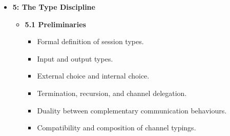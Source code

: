\begin{itemize}
\begin{itemize}
        \item \textbf{4.2 Unbounded Interactions}
        \begin{itemize}
            \item Representation of repeated interactions within one session.
            \item Recursive behaviours and unbounded communication sequences.
            \item Use of recursion to preserve session state across repeated requests.
            \item ATM example with repeated operations and a termination choice.
        \end{itemize}

        \item \textbf{4.3 Delegation}
        \begin{itemize}
            \item Transfer of an existing session channel between processes.
            \item Delegation as a mechanism for distributing computation.
            \item Support for modularity and concurrent request handling.
            \item FTP server example involving server threads and user sessions.
            \item Role of the type discipline in detecting inconsistent interactions.
        \end{itemize}
    \end{itemize}

    \item \textbf{5: The Type Discipline}
    \begin{itemize}
        \item \textbf{5.1 Preliminaries}
        \begin{itemize}
            \item Formal definition of session types.
            \item Input and output types.
            \item External choice and internal choice.
            \item Termination, recursion, and channel delegation.
            \item Duality between complementary communication behaviours.
            \item Compatibility and composition of channel typings.
        \end{itemize}


\end{itemize}
\end{itemize}
